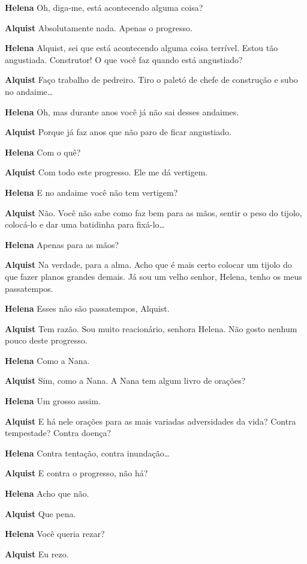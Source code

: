 \textbf{Helena} Oh, diga-me, está acontecendo alguma coisa?

\textbf{Alquist} Absolutamente nada. Apenas o progresso.

\textbf{Helena} Alquist, sei que está acontecendo alguma coisa terrível. Estou tão
angustiada. Construtor! O que você faz quando está angustiado?

\textbf{Alquist} Faço trabalho de pedreiro. Tiro o paletó de chefe de construção e subo
no andaime\ldots{}

\textbf{Helena} Oh, mas durante anos você já não sai desses andaimes.

\textbf{Alquist} Porque já faz anos que não paro de ficar angustiado.

\textbf{Helena} Com o quê?

\textbf{Alquist} Com todo este progresso. Ele me dá vertigem.

\textbf{Helena} E no andaime você não tem vertigem?

\textbf{Alquist} Não. Você não sabe como faz bem para as mãos, sentir o peso do tijolo,
colocá-lo e dar uma batidinha para fixá-lo\ldots{} 

\textbf{Helena} Apenas para as mãos?

\textbf{Alquist} Na verdade, para a alma. Acho que é mais certo colocar um
tijolo do que fazer planos grandes demais. Já sou um velho senhor, Helena, tenho
os meus passatempos.

\textbf{Helena} Esses não são passatempos, Alquist.

\textbf{Alquist} Tem razão. Sou muito reacionário, senhora Helena. Não gosto nenhum
pouco deste progresso.

\textbf{Helena} Como a Nana.

\textbf{Alquist} Sim, como a Nana. A Nana tem algum livro de orações?

\textbf{Helena} Um grosso assim.

\textbf{Alquist} E há nele orações para as mais variadas adversidades da vida? Contra tempestade?
Contra doença?

\textbf{Helena} Contra tentação, contra inundação\ldots{}

\textbf{Alquist} E contra o progresso, não há?

\textbf{Helena} Acho que não.

\textbf{Alquist} Que pena.

\textbf{Helena} Você queria rezar?

\textbf{Alquist} Eu rezo.

